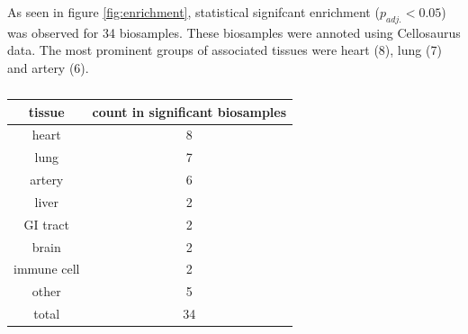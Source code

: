As seen in figure \ref{fig:enrichment}, statistical signifcant enrichment ($p_{adj.}<0.05$) was observed for 34 biosamples. These biosamples were annoted using Cellosaurus data. The most prominent groups of associated tissues were heart (8), lung (7) and artery (6).


\begin{table}[h]
\capstart
\centering
\begin{minipage}{\captionwidth}
    \caption[enriched tissues]{}
    \label{tab:enriched_tissues}
\end{minipage}
\begin{tabular}{|c|c|}
    \hline
    tissue      & count in significant biosamples \\ \hline
    heart       & 8                               \\
    lung        & 7                               \\
    artery      & 6                               \\
    liver       & 2                               \\
    GI tract    & 2                               \\
    brain       & 2                               \\
    immune cell & 2                               \\
    other       & 5                               \\ \hline
    total       & 34                              \\ \hline
    \end{tabular}
\end{table}
